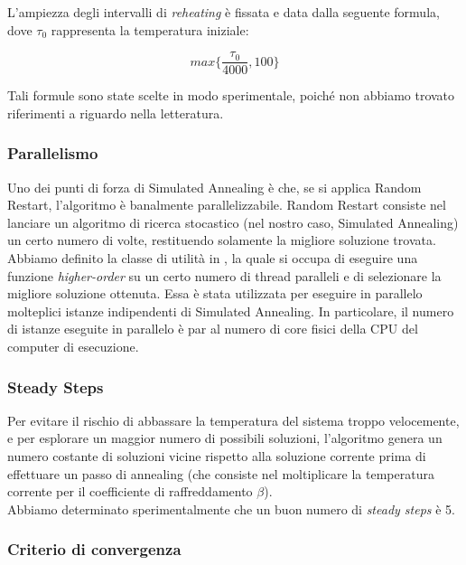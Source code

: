 L'ampiezza degli intervalli di \textit{reheating} è fissata e data dalla seguente formula, dove $\tau{}_0$ rappresenta la temperatura iniziale:

\begin{equation}
    max\{ \frac{\tau{}_0}{4000}, 100 \}
\end{equation}

\noindent Tali formule sono state scelte in modo sperimentale, poiché non abbiamo trovato riferimenti a riguardo nella letteratura.

\subsubsection{Parallelismo}

Uno dei punti di forza di Simulated Annealing è che, se si applica Random Restart, l'algoritmo è banalmente parallelizzabile.
Random Restart consiste nel lanciare un algoritmo di ricerca stocastico (nel nostro caso, Simulated Annealing) un certo numero di volte, restituendo solamente la migliore soluzione trovata. \\

\noindent Abbiamo definito la classe di utilità  in , la quale si occupa di eseguire una funzione \textit{higher-order} su un certo numero di thread paralleli e di selezionare la migliore soluzione ottenuta. Essa è stata utilizzata per eseguire in parallelo molteplici istanze indipendenti di Simulated Annealing. In particolare, il numero di istanze eseguite in parallelo è par al numero di core fisici della CPU del computer di esecuzione.

\subsubsection{Steady Steps}

\noindent Per evitare il rischio di abbassare la temperatura del sistema troppo velocemente, e per esplorare un maggior numero di possibili soluzioni, l'algoritmo genera un numero costante di soluzioni vicine rispetto alla soluzione corrente prima di effettuare un passo di annealing (che consiste nel moltiplicare la temperatura corrente per il coefficiente di raffreddamento $\beta$). \\

\noindent Abbiamo determinato sperimentalmente che un buon numero di \textit{steady steps} è 5.

\subsubsection{Criterio di convergenza}

